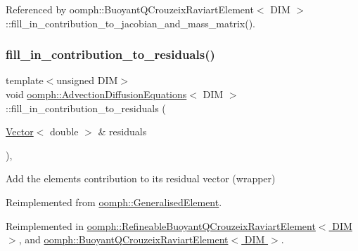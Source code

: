 Referenced by oomph\+::\+Buoyant\+Q\+Crouzeix\+Raviart\+Element$<$ D\+I\+M $>$\+::fill\+\_\+in\+\_\+contribution\+\_\+to\+\_\+jacobian\+\_\+and\+\_\+mass\+\_\+matrix().

\mbox{\label{classoomph_1_1AdvectionDiffusionEquations_ae56ee6b085c75be438a598244c527fb5}} 
\subsubsection{\texorpdfstring{fill\+\_\+in\+\_\+contribution\+\_\+to\+\_\+residuals()}{fill\_in\_contribution\_to\_residuals()}}
{\footnotesize\ttfamily template$<$unsigned D\+IM$>$ \\
void \hyperlink{classoomph_1_1AdvectionDiffusionEquations}{oomph\+::\+Advection\+Diffusion\+Equations}$<$ D\+IM $>$\+::fill\+\_\+in\+\_\+contribution\+\_\+to\+\_\+residuals (\begin{DoxyParamCaption}\item[{\hyperlink{classoomph_1_1Vector}{Vector}$<$ double $>$ \&}]{residuals }\end{DoxyParamCaption})\hspace{0.3cm}{\ttfamily [inline]}, {\ttfamily [virtual]}}



Add the element\textquotesingle{}s contribution to its residual vector (wrapper) 



Reimplemented from \hyperlink{classoomph_1_1GeneralisedElement_a310c97f515e8504a48179c0e72c550d7}{oomph\+::\+Generalised\+Element}.



Reimplemented in \hyperlink{classoomph_1_1RefineableBuoyantQCrouzeixRaviartElement_a102b3aeb79d9af430b9ce0a7c8d5bd33}{oomph\+::\+Refineable\+Buoyant\+Q\+Crouzeix\+Raviart\+Element$<$ D\+I\+M $>$}, and \hyperlink{classoomph_1_1BuoyantQCrouzeixRaviartElement_ab87ed100a54d40884a70a67fcc305ecf}{oomph\+::\+Buoyant\+Q\+Crouzeix\+Raviart\+Element$<$ D\+I\+M $>$}.



